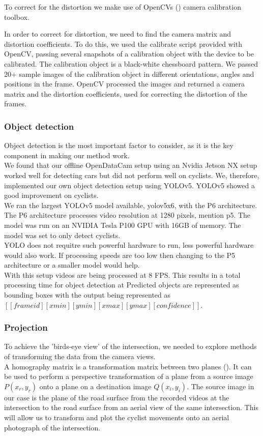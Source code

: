 To correct for the distortion we make use of OpenCVs (\cite{noauthor_opencv/opencv_2021}) camera calibration toolbox.

In order to correct for distortion, we need to find the camera matrix and distortion coefficients. To do this, we used the calibrate script provided with OpenCV,
passing several snapshots of a calibration object with the device to be calibrated. The calibration object is a black-white chessboard pattern.
We passed 20+ sample images of the calibration object in different orientations, angles and positions in the frame. OpenCV processed the images and
returned a camera matrix and the distortion coefficients, used for correcting the distortion of the frames.
\ \\

\subsubsection{Object detection}
Object detection is the most important factor to consider, as it is the key component in making our method work.
\ \\

We found that our offline OpenDataCam setup using an Nvidia Jetson NX setup worked well for detecting cars but did not perform well on cyclists. 
We, therefore, implemented our own object detection setup using
YOLOv5. YOLOv5 showed a good improvement on cyclists.
\ \\ 
We ran the largest YOLOv5 model available, yolov5x6, with the P6 architecture. The P6 architecture processes video resolution
at 1280 pixels, mention p5. The model was run on an NVIDIA Tesla P100 GPU with 16GB of memory. The model was set to only detect cyclists.
\ \\
YOLO does not requitre such powerful hardware to run, less powerful hardware would also work.
If processing speeds are too low then changing to the P5 architecture or a smaller model would help. 
\ \\
With this setup videos are being processed at 8 FPS. This results in a total processing time for object detection at 
Predicted objects are represented as bounding boxes with the output being represented as $[[frame id][xmin][ymin][xmax][ymax][confidence]]$.

\subsubsection{Projection}
To achieve the 'birds-eye view' of the intersection, we needed to explore methods of 
transforming the data from the camera views.  
\ \\
A homography matrix is a transformation matrix between two planes (\cite{hartley_zisserman_2004}). It 
can be used to perform a perspective transformation of a plane from a source image $P(x_r, y_r)$ onto 
a plane on a destination image $Q(x_i, y_i)$.
The source image in our case is the plane of the road surface from the recorded videos at the intersection 
to the road surface from an aerial view of the same intersection. 
This will allow us to transform and plot the cyclist movements onto an aerial photograph of the intersection.
\ \\ 

